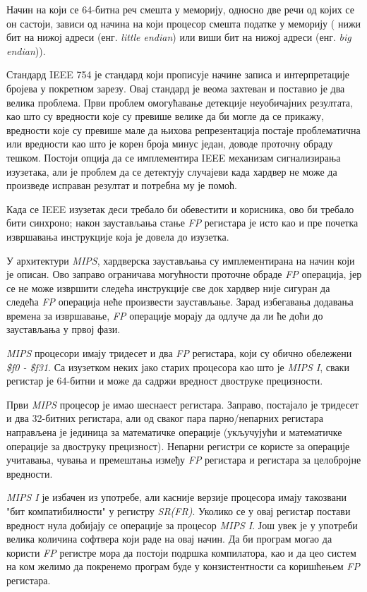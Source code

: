 \documentclass[12pt,oneside]{memoir}
\begin{document}
\indent Начин на који се 64-битна реч смешта у меморију, односно две речи од којих се он састоји, зависи од начина на који процесор смешта податке у меморију ( нижи бит на нижој адреси (енг. \textit{little endian}) или виши бит на нижој адреси (енг. \textit{big endian})). 

\indent Стандард IEEE 754 је стандард који прописује начине записа и интерпретације бројева у покретном зарезу. Овај стандард је веома захтеван и поставио је два велика проблема. Први проблем омогућавање детекције неуобичајних резултата, као што су вредности које су превише велике да би могле да се прикажу, вредности које су превише мале да њихова репрезентација постаје проблематична или вредности као што је корен броја минус један, доводе проточну обраду тешком. Постоји опција да се имплементира IEEE механизам сигнализирања изузетака, али је проблем да се детектују случајеви када хардвер не може да произведе исправан резултат и потребна му је помоћ.

\indent Када се IEEE изузетак деси требало би обевестити и корисника, ово би требало бити синхроно; након заустављања стање \textit{FP} регистара је исто као и пре почетка извршавања инструкције која је довела до изузетка.

\indent У архитектури \textit{MIPS}, хардверска заустављања су имплементирана на начин који је описан. Ово заправо ограничава могућности проточне обраде \textit{FP} операција, јер се не може извршити следећа инструкције све док хардвер није сигуран да следећа \textit{FP} операција неће произвести заустављање. Зарад избегавања додавања времена за извршавање, \textit{FP} операције морају да одлуче да ли ће доћи до заустављања у првој фази. 

\indent \textit{MIPS} процесори имају тридесет и два \textit{FP} регистара, који су обично обележени \textit{\$f0 - \$f31}. Са изузетком неких јако старих процесора као што је \textit{MIPS I}, сваки регистар је 64-битни и може да садржи вредност двоструке прецизности.

\indent Први \textit{MIPS} процесор је имао шеснаест регистара. Заправо, постајало је тридесет и два 32-битних регистара, али од сваког пара парно/непарних регистара направљена је јединица за математичке операције (укључујући и математичке операције за двоструку прецизност). Непарни регистри се користе за операције учитавања, чувања и премештања између \textit{FP} регистара и регистара за целобројне вредности.

\indent \textit{MIPS I} је избачен из употребе, али касније верзије процесора имају такозвани "бит компатибилности" у регистру \textit{SR(FR)}. Уколико се у овај регистар постави вредност нула добијају се операције за процесор \textit{MIPS I}. Још увек је у употреби велика количина софтвера који раде на овај начин. Да би програм могао да користи \textit{FP} регистре мора да постоји подршка компилатора, као и да цео систем на ком желимо да покренемо програм буде у конзистентности са коришћењем \textit{FP} регистара.
\end{document}
